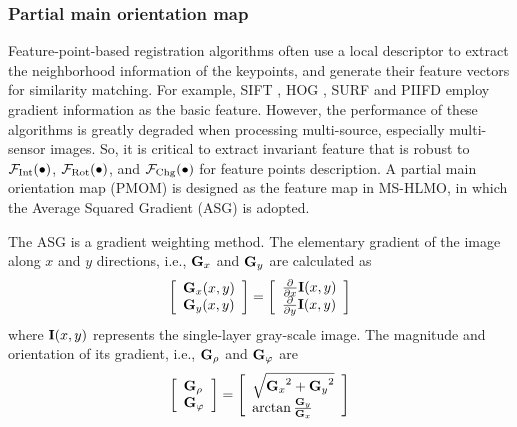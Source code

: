 \subsubsection{Partial main orientation map}
Feature-point-based registration algorithms often use a local descriptor to extract the neighborhood information of the keypoints, and generate their feature vectors for similarity matching. For example, SIFT \cite{lowe2004distinctive}, HOG \cite{dalal2005histograms}, SURF \cite{bay2006surf} and PIIFD \cite{chen2010partial} employ gradient information as the basic feature. However, the performance of these algorithms is greatly degraded when processing multi-source, especially multi-sensor images. So, it is critical to extract invariant feature that is robust to ${{\cal F}_{\rm{Int}}}( \bullet )$, ${{\cal F}_{\rm{Rot}}}( \bullet )$, and ${{\cal F}_{\rm{Chg}}}( \bullet )$ for feature points description. A partial main orientation map (PMOM) is designed as the feature map in MS-HLMO, in which the Average Squared Gradient (ASG)\cite{kass1987analyzing} is adopted.

The ASG is a gradient weighting method. The elementary gradient of the image along $x$ and $y$ directions, i.e., ${\bf{G}}_x$ and ${\bf{G}}_y$ are calculated as
\begin{equation} \label{eqPMOM1}
\left[ \begin{array}{l}
{{\bf{G}}_x}(x,y)\\
{{\bf{G}}_y}(x,y)
\end{array} \right] = \left[ \begin{array}{l}
\frac{\partial }{{\partial x}}{\bf{I}}(x,y)\\
\frac{\partial }{{\partial y}}{\bf{I}}(x,y)
\end{array} \right]
\end{equation}
where ${\bf{I}}(x,y)$ represents the single-layer gray-scale image. The magnitude and orientation of its gradient, i.e., ${\bf{G}}_\rho$ and ${\bf{G}}_\varphi$ are
\begin{equation} \label{eqPMOM2}
\left[ \begin{array}{l}
{{\bf{G}}_\rho}\\
{{\bf{G}}_\varphi}
\end{array} \right] = \left[ \begin{array}{l}
\sqrt {{{\bf{G}}_x}^2 + {{\bf{G}}_y}^2} \\
\arctan \frac{{\bf{G}}_y}{{\bf{G}}_x}
\end{array} \right]\end
{equation}

